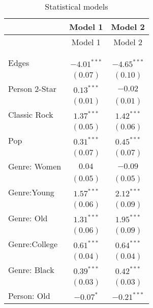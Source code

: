


\begin{center}
\begin{longtable}{l c c}
\toprule
 & Model 1 & Model 2 \\
\midrule
\endfirsthead
\toprule
 & Model 1 & Model 2 \\
\midrule
\endhead
\bottomrule
\endfoot
\bottomrule
\multicolumn{3}{l}{\scriptsize{$^{***}p<0.001$; $^{**}p<0.01$; $^{*}p<0.05$}}\\
\caption{Statistical models}
\label{table:coefficients}
\endlastfoot \\
Edges                             & $-4.01^{***}$ & $-4.65^{***}$ \\
                                  & $(0.07)$      & $(0.10)$      \\
Person 2-Star                     & $0.13^{***}$  & $-0.02$       \\
                                  & $(0.01)$      & $(0.01)$      \\
Classic Rock                      & $1.37^{***}$  & $1.42^{***}$  \\
                                  & $(0.05)$      & $(0.06)$      \\
Pop                               & $0.31^{***}$  & $0.45^{***}$  \\
                                  & $(0.07)$      & $(0.07)$      \\
Genre: Women                      & $0.04$        & $-0.09$       \\
                                  & $(0.05)$      & $(0.05)$      \\
Genre:Young                       & $1.57^{***}$  & $2.12^{***}$  \\
                                  & $(0.06)$      & $(0.09)$      \\
Genre: Old                        & $1.31^{***}$  & $1.95^{***}$  \\
                                  & $(0.06)$      & $(0.09)$      \\
Genre:College                     & $0.61^{***}$  & $0.64^{***}$  \\
                                  & $(0.04)$      & $(0.04)$      \\
Genre: Black                      & $0.39^{***}$  & $0.42^{***}$  \\
                                  & $(0.03)$      & $(0.03)$      \\
Person: Old                       & $-0.07^{*}$   & $-0.21^{***}$ \\

\end{longtable}
\end{center}

